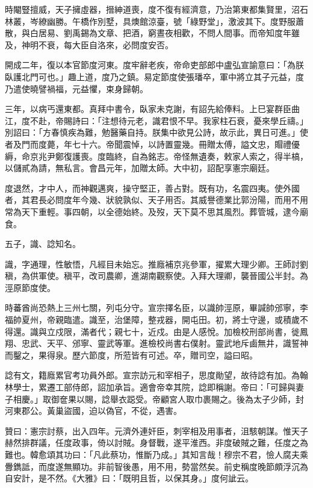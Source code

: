 \begin{pinyinscope}
 時閹豎擅威，天子擁虛器，搢紳道喪，度不復有經濟意，乃治第東都集賢里，沼石林叢，岑繚幽勝。午橋作別墅，具燠館涼臺，號「綠野堂」，激波其下。度野服蕭散，與白居易、劉禹錫為文章、把酒，窮晝夜相歡，不問人間事。而帝知度年雖及，神明不衰，每大臣自洛來，必問度安否。



 開成二年，復以本官節度河東。度牢辭老疾，帝命吏部郎中盧弘宣諭意曰：「為朕臥護北門可也。」趣上道，度乃之鎮。易定節度使張璠卒，軍中將立其子元益，度乃遣使曉譬禍福，元益懼，束身歸朝。



 三年，以病丐還東都。真拜中書令，臥家未克謝，有詔先給俸料。上巳宴群臣曲江，度不赴，帝賜詩曰：「注想待元老，識君恨不早。我家柱石衰，憂來學丘禱。」別詔曰：「方春慎疾為難，勉醫藥自持。朕集中欲見公詩，故示此，異日可進。」使者及門而度薨，年七十六。帝聞震悼，以詩置靈幾。冊贈太傅，謚文忠，賵禮優縟，命京兆尹鄭復護喪。度臨終，自為銘志。帝怪無遺奏，敕家人索之，得半槁，以儲貳為請，無私言。會昌元年，加贈太師。大中初，詔配享憲宗廟廷。



 度退然，才中人，而神觀邁爽，操守堅正，善占對。既有功，名震四夷。使外國者，其君長必問度年今幾、狀貌孰似、天子用否。其威譽德業比郭汾陽，而用不用常為天下重輕。事四朝，以全德始終。及歿，天下莫不思其風烈。葬管城，逮今廟食。



 五子，識、諗知名。



 識，字通理，性敏悟，凡經目未始忘。推廕補京兆參軍，擢累大理少卿。王師討劉稹，為供軍使。稹平，改司農卿，進湖南觀察使。入拜大理卿，襲晉國公半封。為涇原節度使。



 時蕃酋尚恐熱上三州七關，列屯分守。宣宗擇名臣，以識帥涇原，畢諴帥邠寧，李福帥夏州，帝親臨遣。識至，治堡障，整戎器，開屯田。初，將士守邊，或積歲不得還。識與立戍限，滿者代；親七十，近戍。由是人感悅。加檢校刑部尚書，徙鳳翔、忠武、天平、邠寧、靈武等軍。進檢校尚書右僕射。靈武地斥鹵無井，識誓神而鑿之，果得泉。歷六節度，所蒞皆有可述。卒，贈司空，謚曰昭。



 諗有文，籍廕累官考功員外郎。宣宗訪元和宰相子，思度勛望，故待諗有加。為翰林學士，累遷工部侍郎，詔加承旨。適會帝幸其院，諗即稱謝。帝曰：「可歸與妻子相慶。」取御奩果以賜，諗舉衣跽受。帝顧宮人取巾裹賜之。後為太子少師，封河東郡公。黃巢盜國，迫以偽官，不從，遇害。



 贊曰：憲宗討蔡，出入四年。元濟外連奸臣，刺宰相及用事者，沮駭朝謀。惟天子赫然排群議，任度政事，倚以討賊。身督戰，遂平淮西。非度破賊之難，任度之為難也。韓愈頌其功曰：「凡此蔡功，惟斷乃成。」其知言哉！穆宗不君，憸人腐夫乘釁鐫詆，而度遂無顯功。非前智後愚，用不用，勢當然矣。前史稱度晚節頗浮沉為自安計，是不然。《大雅》曰：「既明且哲，以保其身。」度何訿云。



\end{pinyinscope}